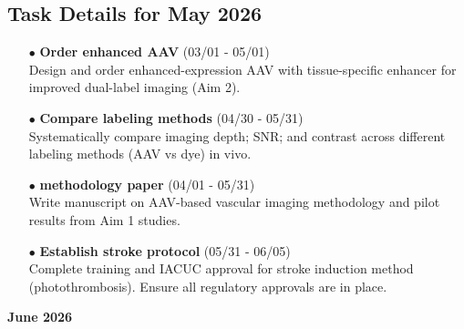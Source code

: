 \documentclass[landscape,a4paper]{article}
\begin{document}
\subsection{Task Details for May 2026}
\begin{itemize}[leftmargin=1cm]
    \item[\textcolor{other}{$\bullet$}] \textbf{Order enhanced AAV} (03/01 - 05/01)\\ Design and order enhanced-expression AAV with tissue-specific enhancer for improved dual-label imaging (Aim 2).
    \item[\textcolor{other}{$\bullet$}] \textbf{Compare labeling methods} (04/30 - 05/31)\\ Systematically compare imaging depth; SNR; and contrast across different labeling methods (AAV vs dye) in vivo.
    \item[\textcolor{researchout}{$\bullet$}] \textbf{methodology paper} (04/01 - 05/31)\\ Write manuscript on AAV-based vascular imaging methodology and pilot results from Aim 1 studies.
    \item[\textcolor{other}{$\bullet$}] \textbf{Establish stroke protocol} (05/31 - 06/05)\\ Complete training and IACUC approval for stroke induction method (photothrombosis). Ensure all regulatory approvals are in place.
\end{itemize}

\newpage
\pagestyle{empty}

\begin{center}
{\large\textbf{June 2026}}
\end{center}

\vspace{0.5cm}
\end{document}
